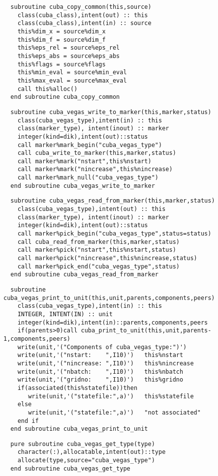 \begin{Verbatim}
  subroutine cuba_copy_common(this,source)
    class(cuba_class),intent(out) :: this
    class(cuba_class),intent(in) :: source
    this%dim_x = source%dim_x
    this%dim_f = source%dim_f
    this%eps_rel = source%eps_rel
    this%eps_abs = source%eps_abs
    this%flags = source%flags
    this%min_eval = source%min_eval
    this%max_eval = source%max_eval
    call this%alloc()
  end subroutine cuba_copy_common
\end{Verbatim}
\begin{Verbatim}
  subroutine cuba_vegas_write_to_marker(this,marker,status)
    class(cuba_vegas_type),intent(in) :: this
    class(marker_type), intent(inout) :: marker
    integer(kind=dik),intent(out)::status
    call marker%mark_begin("cuba_vegas_type")
    call cuba_write_to_marker(this,marker,status)
    call marker%mark("nstart",this%nstart)
    call marker%mark("nincrease",this%nincrease)
    call marker%mark_null("cuba_vegas_type")
  end subroutine cuba_vegas_write_to_marker
\end{Verbatim}

\begin{Verbatim}
  subroutine cuba_vegas_read_from_marker(this,marker,status)
    class(cuba_vegas_type),intent(out) :: this
    class(marker_type), intent(inout) :: marker
    integer(kind=dik),intent(out)::status
    call marker%pick_begin("cuba_vegas_type",status=status)
    call cuba_read_from_marker(this,marker,status)
    call marker%pick("nstart",this%nstart,status)
    call marker%pick("nincrease",this%nincrease,status)
    call marker%pick_end("cuba_vegas_type",status)
  end subroutine cuba_vegas_read_from_marker
\end{Verbatim}

\begin{Verbatim}
  subroutine cuba_vegas_print_to_unit(this,unit,parents,components,peers)
    class(cuba_vegas_type),intent(in) :: this
    INTEGER, INTENT(IN) :: unit
    integer(kind=dik),intent(in)::parents,components,peers
    if(parents>0)call cuba_print_to_unit(this,unit,parents-1,components,peers)
    write(unit,'("Components of cuba_vegas_type:")')
    write(unit,'("nstart:    ",I10)')   this%nstart
    write(unit,'("nincrease: ",I10)')   this%nincrease
    write(unit,'("nbatch:    ",I10)')   this%nbatch
    write(unit,'("gridno:    ",I10)')   this%gridno
    if(associated(this%statefile))then
       write(unit,'("statefile:",a)')   this%statefile
    else
       write(unit,'("statefile:",a)')   "not associated"
    end if
  end subroutine cuba_vegas_print_to_unit
\end{Verbatim}
\begin{Verbatim}
  pure subroutine cuba_vegas_get_type(type)
    character(:),allocatable,intent(out)::type
    allocate(type,source="cuba_vegas_type")
  end subroutine cuba_vegas_get_type
\end{Verbatim}


